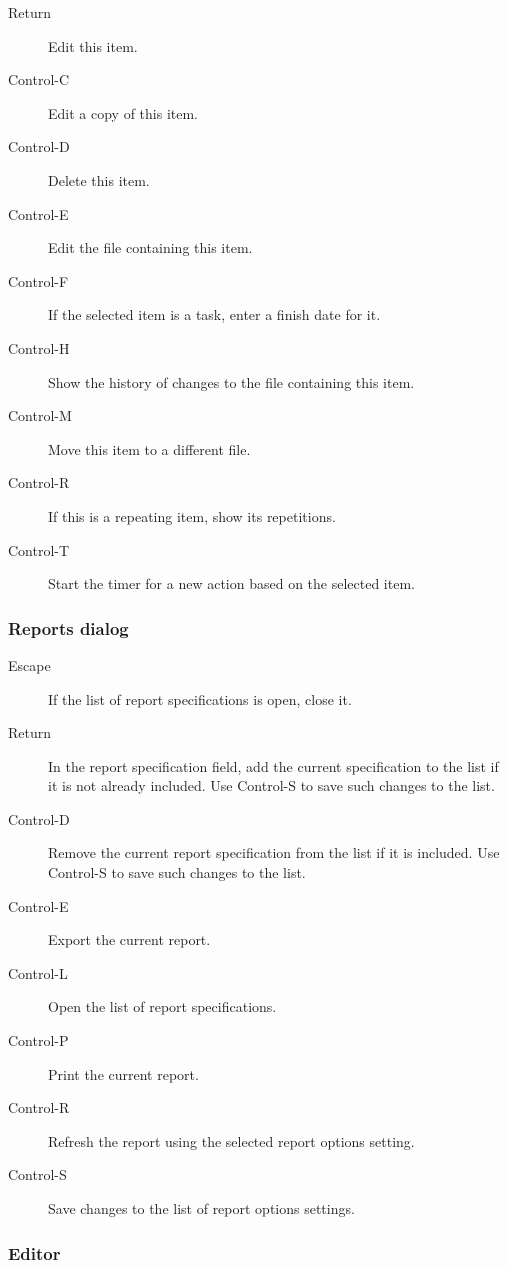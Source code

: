 \documentclass[]{article}
\begin{document}
\begin{description}
\item[Return]
Edit this item.
\item[Control-C]
Edit a copy of this item.
\item[Control-D]
Delete this item.
\item[Control-E]
Edit the file containing this item.
\item[Control-F]
If the selected item is a task, enter a finish date for it.
\item[Control-H]
Show the history of changes to the file containing this item.
\item[Control-M]
Move this item to a different file.
\item[Control-R]
If this is a repeating item, show its repetitions.
\item[Control-T]
Start the timer for a new action based on the selected item.
\end{description}

\subsubsection{Reports dialog}

\begin{description}
\item[Escape]
If the list of report specifications is open, close it.
\item[Return]
In the report specification field, add the current specification to the
list if it is not already included. Use Control-S to save such changes
to the list.
\item[Control-D]
Remove the current report specification from the list if it is included.
Use Control-S to save such changes to the list.
\item[Control-E]
Export the current report.
\item[Control-L]
Open the list of report specifications.
\item[Control-P]
Print the current report.
\item[Control-R]
Refresh the report using the selected report options setting.
\item[Control-S]
Save changes to the list of report options settings.
\end{description}

\subsubsection{Editor}
\end{document}
